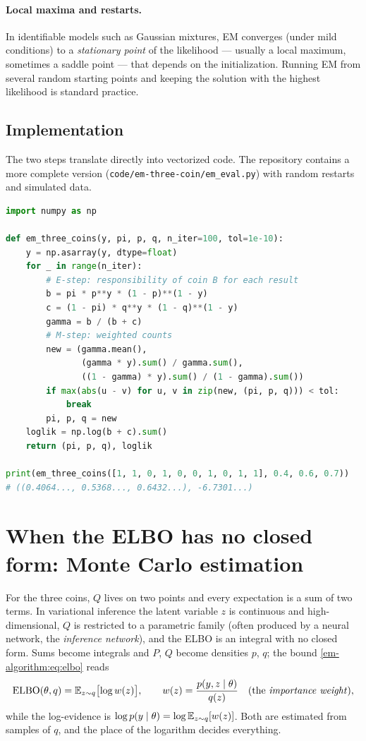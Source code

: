 \begin{notechapter}
\paragraph{Local maxima and restarts.} In identifiable models such as Gaussian
mixtures, EM converges (under mild conditions) to a \emph{stationary point} of the
likelihood --- usually a local maximum, sometimes a saddle point --- that depends on
the initialization. Running EM from several random starting points and keeping
the solution with the highest likelihood is standard practice.

\subsection{Implementation}

The two steps translate directly into vectorized code. The repository contains a
more complete version (\texttt{code/em-three-coin/em\_eval.py}) with random
restarts and simulated data.

\begin{lstlisting}[language=Python, caption={EM for the three-coin model.}]
import numpy as np

def em_three_coins(y, pi, p, q, n_iter=100, tol=1e-10):
    y = np.asarray(y, dtype=float)
    for _ in range(n_iter):
        # E-step: responsibility of coin B for each result
        b = pi * p**y * (1 - p)**(1 - y)
        c = (1 - pi) * q**y * (1 - q)**(1 - y)
        gamma = b / (b + c)
        # M-step: weighted counts
        new = (gamma.mean(),
               (gamma * y).sum() / gamma.sum(),
               ((1 - gamma) * y).sum() / (1 - gamma).sum())
        if max(abs(u - v) for u, v in zip(new, (pi, p, q))) < tol:
            break
        pi, p, q = new
    loglik = np.log(b + c).sum()
    return (pi, p, q), loglik

print(em_three_coins([1, 1, 0, 1, 0, 0, 1, 0, 1, 1], 0.4, 0.6, 0.7))
# ((0.4064..., 0.5368..., 0.6432...), -6.7301...)
\end{lstlisting}

\section{When the ELBO has no closed form: Monte Carlo estimation}\label{em-algorithm:sec:mc-elbo}

For the three coins, $Q$ lives on two points and every expectation is a sum of
two terms. In variational inference the latent variable $z$ is continuous and
high-dimensional, $Q$ is restricted to a parametric family (often produced by a
neural network, the \emph{inference network}), and the ELBO is an integral with no
closed form. Sums become integrals and $P$, $Q$ become densities $p$, $q$; the bound
\eqref{em-algorithm:eq:elbo} reads
\[
  \mathrm{ELBO}(\theta, q) = \mathbb{E}_{z\sim q}\bigl[\log w(z)\bigr],\qquad
  w(z) = \frac{p(y,z\mid\theta)}{q(z)}\quad\text{(the \emph{importance weight})},
\]
while the log-evidence is $\log p(y\mid\theta) = \log\mathbb{E}_{z\sim q}[w(z)]$. Both are
estimated from samples of $q$, and the place of the logarithm decides everything.


\end{notechapter}
